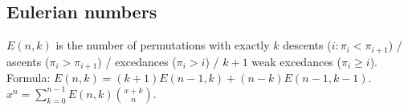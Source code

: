 \documentclass[12pt]{extarticle}
\begin{document}
\begin{multicols*}{2}


\subsection{Eulerian numbers}
$E(n,k)$ is the number of permutations with exactly
$k$ descents ($i: \pi_i < \pi_{i+1}$) /
ascents ($\pi_i > \pi_{i+1}$) /
excedances ($\pi_i > i$) /
$k+1$ weak excedances ($\pi_i \ge i$). \\
Formula: $E(n,k)=(k+1)E(n-1,k)+(n-k)E(n-1,k-1)$. \quad
$x^n = \sum_{k=0}^{n-1} E(n,k) {x+k \choose n}$.




\end{multicols*}
\end{document}
